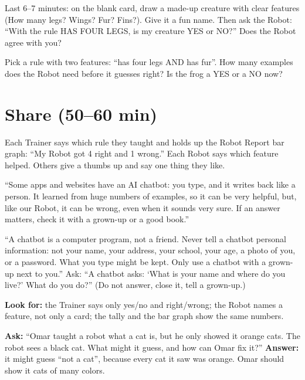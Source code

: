 \begin{freebuild}
Last 6--7 minutes: on the blank card, draw a made-up creature with clear features (How many legs? Wings? Fur? Fins?). Give it a fun name. Then ask the Robot: \enquote{With the rule HAS FOUR LEGS, is my creature YES or NO?} Does the Robot agree with you?
\end{freebuild}

\begin{stretchchallenge}
Pick a rule with two features: \enquote{has four legs AND has fur}. How many examples does the Robot need before it guesses right? Is the frog a YES or a NO now?
\end{stretchchallenge}

\section{Share (50--60 min)}
\begin{teacherscript}
Each Trainer says which rule they taught and holds up the Robot Report bar graph: \enquote{My Robot got 4 right and 1 wrong.} Each Robot says which feature helped. Others give a thumbs up and say one thing they like.
\end{teacherscript}

\begin{safety}
\enquote{Some apps and websites have an AI chatbot: you type, and it writes back like a person. It learned from huge numbers of examples, so it can be very helpful, but, like our Robot, it can be wrong, even when it sounds very sure. If an answer matters, check it with a grown-up or a good book.}

\enquote{A chatbot is a computer program, not a friend. Never tell a chatbot personal information: not your name, your address, your school, your age, a photo of you, or a password. What you type might be kept. Only use a chatbot with a grown-up next to you.} Ask: \enquote{A chatbot asks: \enquote{What is your name and where do you live?} What do you do?} (Do not answer, close it, tell a grown-up.)
\end{safety}

\begin{formativecheck}
\textbf{Look for:} the Trainer says only yes/no and right/wrong; the Robot names a feature, not only a card; the tally and the bar graph show the same numbers.

\textbf{Ask:} \enquote{Omar taught a robot what a cat is, but he only showed it orange cats. The robot sees a black cat. What might it guess, and how can Omar fix it?}
\textbf{Answer:} it might guess \enquote{not a cat}, because every cat it saw was orange. Omar should show it cats of many colors.
\end{formativecheck}

